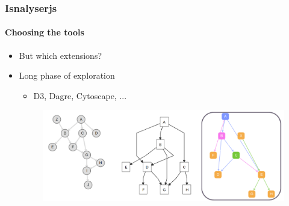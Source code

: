 \documentclass[9pt]{beamer}
\begin{document}
\begin{frame}
\frametitle{Isnalyserjs}
\framesubtitle{Choosing the tools}
\begin{itemize}%
	\item But which extensions?
	\item Long phase of exploration
	\begin{itemize}
		\item D3, Dagre, Cytoscape, ...
	\end{itemize}
	\begin{figure}
		\flushleft
		\includegraphics[width=1\linewidth]{figures/js_libs_3.pdf}
	\end{figure}
\end{itemize}
\end{frame} 
\end{document}
